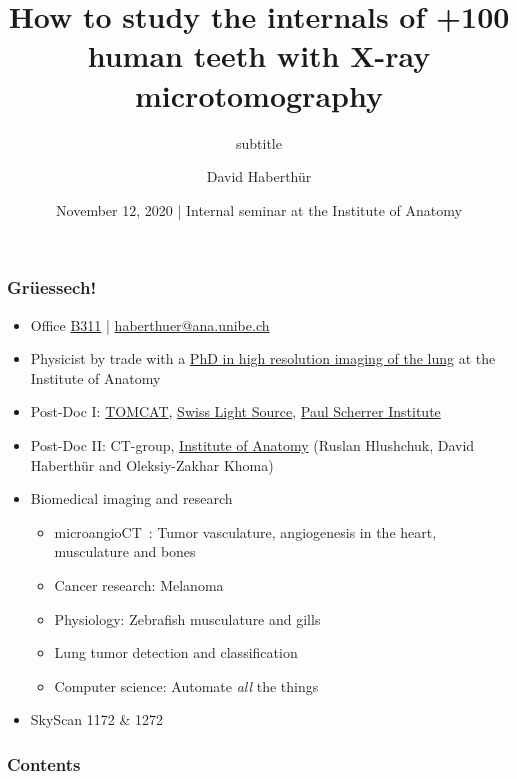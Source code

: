 \documentclass[aspectratio=169]{beamer}
\title{How to study the internals of +100 human teeth with X-ray microtomography}
\subtitle{subtitle}
\author{David Haberthür}
\date{November 12, 2020 | Internal seminar at the Institute of Anatomy}
\newcommand{\uct}{\si{\micro}CT\xspace}%
\begin{document}
{%
	\begin{frame}%
		\maketitle
	\end{frame}%
}

\begin{frame}[label=currentasdf]
	\frametitle{Grüessech!}
	\begin{itemize}
		\item Office \href{http://osm.org/go/0CZwlGp3A?m}{B311} | \href{mailto:haberthuer@ana.unibe.ch?subject=Feedback\%20from\%20the\%20(micro)-tomography\%20lecture}{haberthuer@ana.unibe.ch}
		\item Physicist by trade with a \href{https://boris.unibe.ch/2619/}{PhD in high resolution imaging of the lung} at the Institute of Anatomy
		\item Post-Doc I: \href{https://www.psi.ch/sls/tomcat/}{TOMCAT}, \href{https://www.psi.ch/sls/}{Swiss Light Source}, \href{https://www.psi.ch/}{Paul Scherrer Institute}
		\item Post-Doc II: \uct-group, \href{https://ana.unibe.ch}{Institute of Anatomy} (Ruslan Hlushchuk, David Haberthür and Oleksiy-Zakhar Khoma)
		\item Biomedical imaging and research
		\begin{itemize}
			\item microangioCT~\cite{Hlushchuk2018}: Tumor vasculature, angiogenesis in the heart, musculature and bones
			\item Cancer research: Melanoma
			\item Physiology: Zebrafish musculature and gills~\cite{MesserliAaldijk2020}			
			\item Lung tumor detection and classification
			\item Computer science: Automate \emph{all} the things~\cite{Haberthur2020}
		\end{itemize}
	\item<1-> SkyScan 1172 \& 1272 							
	\end{itemize}
\end{frame}

\begin{frame}
	\frametitle{Contents}
	\tableofcontents
\end{frame}
\end{document}
